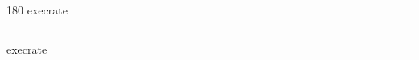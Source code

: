 
\begin{frame}
\begin{center}
\begin{turn}{180}
{\fontsize{2.5cm}{1em}\selectfont execrate}
\end{turn}
\vspace{1em}\par  
\hrule
\vspace{1em}\par  
{\fontsize{2.5cm}{1em}\selectfont execrate}
\end{center}
\end{frame}
